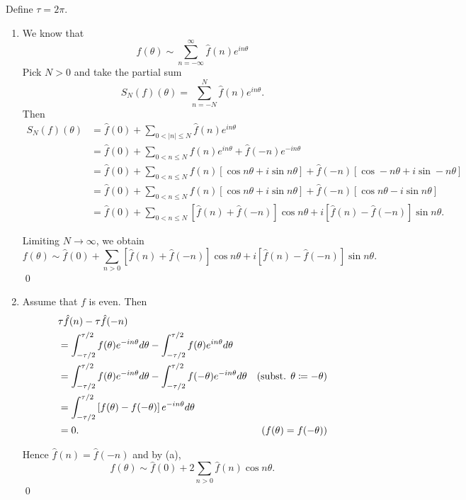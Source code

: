 \documentclass[oneside]{article}
\newcommand\abs[1]{\left|#1\right|}
\begin{document}
Define $\tau = 2\pi$.
\begin{enumerate}[label=(\alph*)]
  \item We know that \[
      f(\theta) \sim \sum_{n=-\infty}^\infty \hat f(n) e^{in\theta}
    \] Pick $N > 0$ and take the partial sum \[
      S_N(f)(\theta) = \sum_{n=-N}^N\hat f(n)e^{in\theta} \text{.}
    \] Then\begin{align*}
      S_N(f)(\theta)
      &= \hat f(0) + \sum_{0 < \abs{n} \leq N}\hat f(n)e^{in\theta} \\
      &= \hat f(0)
       + \sum_{0 < n \leq N}\hat f(n)e^{in\theta} + \hat f(-n)e^{-in\theta} \\
      &= \hat f(0)
       + \sum_{0 < n \leq N}\hat f(n)[\cos n\theta + i \sin n\theta]
       + \hat f(-n)[\cos -n\theta + i \sin -n\theta] \\
      &= \hat f(0)
       + \sum_{0 < n \leq N}\hat f(n)[\cos n\theta + i \sin n\theta]
       + \hat f(-n)[\cos n\theta - i \sin n\theta] \\
      &= \hat f(0)
       + \sum_{0 < n \leq N} [\hat f(n) + \hat f(-n)]\cos n\theta
         + i[\hat f(n) - \hat f(-n)] \sin n\theta \text{.}
    \end{align*}

    Limiting $N \to \infty$, we obtain\[
      f(\theta) \sim \hat f(0)
       + \sum_{n > 0} [\hat f(n) + \hat f(-n)]\cos n\theta
         + i[\hat f(n) - \hat f(-n)] \sin n\theta\text{.}
    \]\qed

  \item Assume that $f$ is even. Then\begin{align*}
      &\tau\hat f(n) - \tau\hat f(-n) \\
      &= \int_{-\tau/2}^{\tau/2} f(\theta)e^{-in\theta}d\theta
      - \int_{-\tau/2}^{\tau/2} f(\theta)e^{in\theta}d\theta \\
      &= \int_{-\tau/2}^{\tau/2} f(\theta)e^{-in\theta}d\theta
      - \int_{-\tau/2}^{\tau/2} f(-\theta)e^{-in\theta}d\theta
      & \text{(subst. $\theta \coloneqq -\theta$)}\\
      &= \int_{-\tau/2}^{\tau/2} \left[f(\theta) - f(-\theta)\right]e^{-in\theta}d\theta \\
      &= 0\text. &\text{($f(\theta) = f(-\theta)$)}
    \end{align*}

    Hence $\hat f(n) = \hat f(-n)$ and by (a), \[
      f(\theta) \sim \hat f(0)
       + 2\sum_{n > 0} \hat f(n) \cos n\theta\text{.}
    \] \qed


\end{enumerate}
\end{document}
